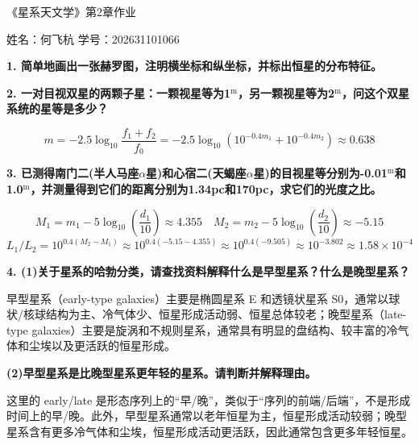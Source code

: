 \documentclass{ctexart}
\begin{document}
\begin{center}
    {\LARGE 《星系天文学》第2章作业}

    \vspace{1em}

    姓名：何飞杭 \qquad 学号：202631101066
\end{center}

\noindent\textbf{1.	简单地画出一张赫罗图，注明横坐标和纵坐标，并标出恒星的分布特征。}

\vspace{24.25em}

\vspace{0.5em}

\noindent\textbf{2.	一对目视双星的两颗子星：一颗视星等为1\(^\mathrm{m}\)，另一颗视星等为2\(^\mathrm{m}\)，问这个双星系统的星等是多少？}

\vspace{0.25em}
\[m = -2.5 \log_{10}\frac{f_1 + f_2}{f_0} = -2.5 \log_{10}(10^{-0.4 m_1} + 10^{-0.4 m_2}) \approx 0.638\]
\vspace{0.5em}

\noindent\textbf{3.	已测得南门二(半人马座\(\alpha\)星)和心宿二(天蝎座\(\alpha\)星)的目视星等分别为-0.01\(^\mathrm{m}\)和1.0\(^\mathrm{m}\)，并测量得到它们的距离分别为1.34pc和170pc，求它们的光度之比。}

\vspace{0.25em}
\[M_1 = m_1 - 5 \log_{10}(\frac{d_1}{10}) \approx 4.355 \quad M_2 = m_2 - 5 \log_{10}(\frac{d_2}{10}) \approx -5.15\]
\[L_1/L_2 = 10^{0.4(M_2 - M_1)} \approx 10^{0.4(-5.15-4.355)} \approx 10^{0.4(-9.505)} \approx 10^{-3.802} \approx 1.58 \times 10^{-4}\]
\vspace{0.5em}

\noindent\textbf{4.	(1)关于星系的哈勃分类，请查找资料解释什么是早型星系？什么是晚型星系？}

\vspace{0.25em}
早型星系（early-type galaxies）主要是椭圆星系 E 和透镜状星系 S0，通常以球状/核球结构为主、冷气体少、恒星形成活动弱、恒星总体较老；晚型星系（late-type galaxies）主要是旋涡和不规则星系，通常具有明显的盘结构、较丰富的冷气体和尘埃以及更活跃的恒星形成。
\vspace{0.5em}

\noindent\textbf{(2)早型星系是比晚型星系更年轻的星系。请判断并解释理由。}

\vspace{0.25em}
这里的 early/late 是形态序列上的“早/晚”，类似于“序列的前端/后端”，不是形成时间上的早/晚。此外，早型星系通常以老年恒星为主，恒星形成活动较弱；晚型星系含有更多冷气体和尘埃，恒星形成活动更活跃，因此通常包含更多年轻恒星。
\end{document}

